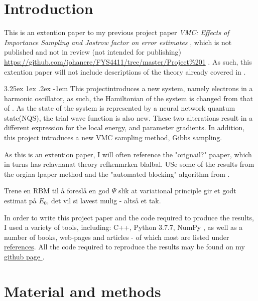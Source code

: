 \documentclass[%
oneside,                 %
final,                   %
10pt]{article}
\makeatletter
\renewcommand\paragraph{\@startsection{paragraph}{5}{\z@}%
  {3.25ex \@plus1ex \@minus.2ex}%
  {-1em}%
  {\normalfont\normalsize\bfseries}}
\makeatother
\begin{document}
\section{Introduction}



This is an extention paper to my previous project paper \textit{VMC: Effects of Importance Sampling and Jastrow factor on error estimates} \cite{JN_P1}, which is not published and not in review (not intended for publishing) \url{https://github.com/johanere/FYS4411/tree/master/Project\%201} . As such, this extention paper will not include descriptions of the theory already covered in \cite{JN_P1}. 

\paragraph{This project}introduces a new system, namely electrons in a harmonic oscillator, as such, the Hamiltonian of the system is changed from that of \cite{JN_P1}. As the state of the system is represented by a neural network quantum state(NQS), the trial wave function is also new. These two alterations result in a different expression for the local energy, and parameter gradients. In addition, this project introduces a new VMC sampling method, Gibbs sampling. 

As this is an extention paper, I will often reference the "orignail?" paaper, which in turns has relavnanat theory refkenmrken blalbal. USe some of the results from the orgina lpaper
method and the "automated blocking" algorithm from \citep{Jonsson}.

 Trene en RBM til å foreslå en god $\Psi$ slik at variational principle gir et godt estimat på $E_0$, det vil si lavest mulig - altså et tak. 
 
In order to write this project paper and the code required to produce the results, I used a variety of tools, including: C++, Python 3.7.7, NumPy \cite{numpy}, as well as a number of books, web-pages and articles - of which most are listed under 
 \hyperref[refer]{references}. All the code required to reproduce the results may be found on my \href{https://github.com/johanere/FYS4411}{github page }.  
\section{Material and methods} \label{theory}
\end{document}
